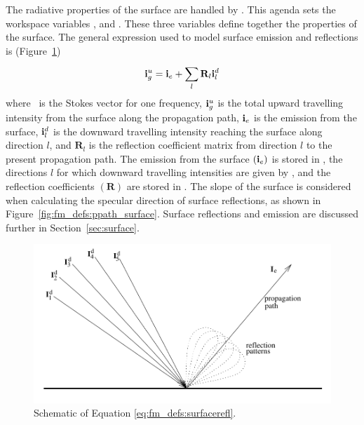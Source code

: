 The radiative properties of the surface are handled by
. This agenda sets the workspace
variables ,  and
. These three variables define
together the properties of the surface. The general
expression used to model surface emission and reflections is
(Figure~\ref{fig:fm_defs:surface_refl})
\begin{equation}
  \mathbf{i}_g^u = \mathbf{i}_e + \sum_l^{} \mathbf{R}_l \mathbf{i}_l^d
  \label{eq:fm_defs:surfacerefl}
\end{equation}
where \MpiVct\ is the Stokes vector for one frequency, $\mathbf{i}_g^u$
is the total upward travelling intensity from the surface along the
propagation path, $\mathbf{i}_e$ is the emission from the surface,
$\mathbf{i}_l^d$ is the downward travelling intensity reaching the surface
along direction $l$, and $\mathbf{R}_l$ is the reflection coefficient
matrix from direction $l$ to the present propagation path. The
emission from the surface $(\mathbf{i}_e)$ is stored in
, the directions $l$ for which downward
travelling intensities are given by , and the
reflection coefficients $(\mathbf{R})$ are stored in
. The slope of the surface is
considered when calculating the specular direction of surface
reflections, as shown in Figure~\ref{fig:fm_defs:ppath_surface}.
Surface reflections and emission are discussed further
in Section~\ref{sec:surface}.

\begin{figure}[!p]
 \begin{center}
  \includegraphics*[width=0.95\hsize]{Figs/fm_definitions/ground_refl}
  \caption{Schematic of Equation \ref{eq:fm_defs:surfacerefl}.}
  \label{fig:fm_defs:surface_refl}
 \end{center}
\end{figure}

